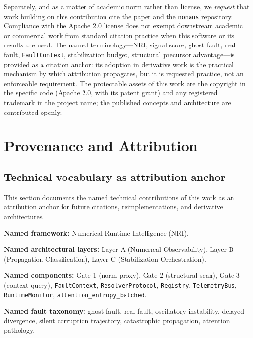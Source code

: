 \documentclass[11pt,a4paper]{article}
\theoremstyle{plain}
\begin{document}
Separately, and as a matter of academic norm rather than license, we
\emph{request} that work building on this contribution cite the paper
and the \texttt{nonans} repository. Compliance with the Apache 2.0
license does not exempt downstream academic or commercial work from
standard citation practice when this software or its results are used.
The named terminology---NRI, signal score, ghost fault, real fault,
\texttt{FaultContext}, stabilization budget, structural precursor
advantage---is provided as a citation anchor: its adoption in derivative
work is the practical mechanism by which attribution propagates, but it
is requested practice, not an enforceable requirement. The protectable
assets of this work are the copyright in the specific code (Apache 2.0,
with its patent grant) and any registered trademark in the project name;
the published concepts and architecture are contributed openly.


\section{Provenance and Attribution}
\label{sec:attribution}

\subsection{Technical vocabulary as attribution anchor}

This section documents the named technical contributions of this work
as an attribution anchor for future citations, reimplementations, and
derivative architectures.

\textbf{Named framework:} Numerical Runtime Intelligence (NRI).

\textbf{Named architectural layers:}
Layer A (Numerical Observability),
Layer B (Propagation Classification),
Layer C (Stabilization Orchestration).

\textbf{Named components:}
Gate 1 (norm proxy), Gate 2 (structural scan), Gate 3 (context query),
\texttt{FaultContext}, \texttt{ResolverProtocol}, \texttt{Registry},
\texttt{TelemetryBus}, \texttt{RuntimeMonitor},
\texttt{attention\_entropy\_batched}.

\textbf{Named fault taxonomy:}
ghost fault, real fault, oscillatory instability, delayed divergence,
silent corruption trajectory, catastrophic propagation,
attention pathology.
\end{document}
